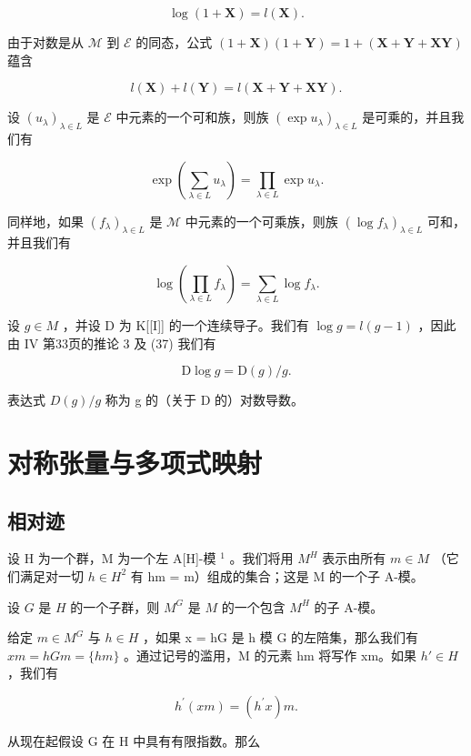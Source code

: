 \[
\log (1 + \mathbf {X}) = l (\mathbf {X}).\tag{38}
\]

由于对数是从 \(\mathcal{M}\) 到 \(\mathcal{E}\) 的同态，公式 \((1 + \mathbf{X})(1 + \mathbf{Y}) = 1 + (\mathbf{X} + \mathbf{Y} + \mathbf{X}\mathbf{Y})\) 蕴含

\[
l (\mathbf {X}) + l (\mathbf {Y}) = l (\mathbf {X} + \mathbf {Y} + \mathbf {X Y}).\tag{39}
\]

设 \((u_{\lambda})_{\lambda \in L}\) 是 \(\mathcal{E}\) 中元素的一个可和族，则族 \((\exp u_{\lambda})_{\lambda \in L}\) 是可乘的，并且我们有

\[
\exp \left(\sum_ {\lambda \in L} u _ {\lambda}\right) = \prod_ {\lambda \in L} \exp u _ {\lambda}.\tag{40}
\]

同样地，如果 \((f_{\lambda})_{\lambda \in L}\) 是 \(\mathcal{M}\) 中元素的一个可乘族，则族 \((\log f_{\lambda})_{\lambda \in L}\) 可和，并且我们有

\[
\log \left(\prod_ {\lambda \in L} f _ {\lambda}\right) = \sum_ {\lambda \in L} \log f _ {\lambda}.\tag{41}
\]

设 \(g \in M\) ，并设 D 为 K{[}{[}I{]}{]} 的一个连续导子。我们有 \(\log g = l(g - 1)\) ，因此由 IV 第33页的推论 3 及 (37) 我们有

\[
\mathrm{D} \log g = \mathrm{D} (g) / g.\tag{42}
\]

表达式 \(D(g)/g\) 称为 g 的（关于 D 的）对数导数。

\section{对称张量与多项式映射}

\subsection{相对迹}

设 H 为一个群，M 为一个左 A{[}H{]}-模 \(^{1}\) 。我们将用 \(M^{H}\) 表示由所有 \(m \in M\) （它们满足对一切 \(h \in H^{2}\) 有 hm = m）组成的集合；这是 M 的一个子 A-模。

设 \(G\) 是 \(H\) 的一个子群，则 \(M^G\) 是 \(M\) 的一个包含 \(M^H\) 的子 A-模。

给定 \(m \in M^{G}\) 与 \(h \in H\) ，如果 x = hG 是 h 模 G 的左陪集，那么我们有 \(xm = hGm = \{hm\}\) 。通过记号的滥用，M 的元素 hm 将写作 xm。如果 \(h' \in H\) ，我们有

\[
h ^ {\prime} (x m) = \left(h ^ {\prime} x\right) m.\tag{1}
\]

从现在起假设 G 在 H 中具有有限指数。那么

